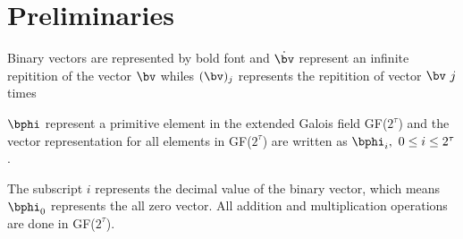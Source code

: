 \section{Preliminaries}
Binary vectors are represented by bold font and $\dot{\bv}$ represent an infinite repitition of the vector $\bv$ whiles $(\bv)_j$ represents the repitition of vector $\bv~j$ times   

$\bphi$ represent a primitive element in the extended Galois field GF($2^{\tau}$) and the vector representation for all elements in GF($2^{\tau}$) are written as $\bphi_i,~0 \leq i \leq 2^{\tau}$. 

The subscript $i$ represents the decimal value of the binary vector, which means $\bphi_0$ represents the all zero vector. All addition and multiplication operations are done in GF($2^{\tau}$).
